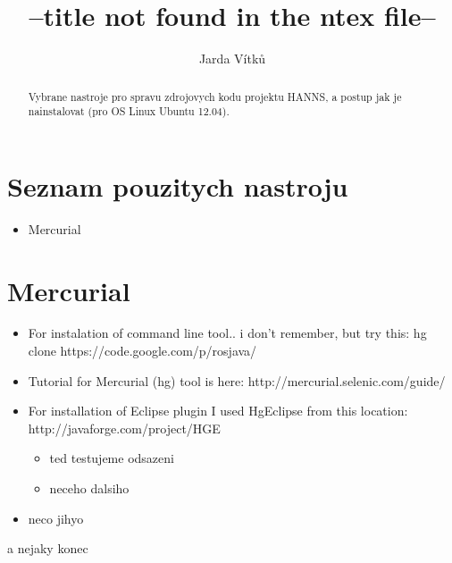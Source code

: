 \documentclass[journal,onecolumn]{IEEEtrancz}
\begin{document}
\title{--title not found in the ntex file--}
\author{Jarda Vítků}

\maketitle

\begin{abstract}
Vybrane nastroje pro spravu zdrojovych kodu projektu HANNS, a postup jak je nainstalovat (pro OS Linux Ubuntu 12.04).
\end{abstract}

\IEEEpeerreviewmaketitle



\section{Seznam pouzitych nastroju}


\begin{itemize}
	\item Mercurial


\end{itemize}
\section{Mercurial}


\begin{itemize}
	\item For instalation of command line tool.. i don't remember, but try this: hg clone https://code.google.com/p/rosjava/ 
	\item Tutorial for Mercurial (hg) tool is here: http://mercurial.selenic.com/guide/
		\vspace{3mm}
	\item For installation of Eclipse plugin I used HgEclipse from this location: http://javaforge.com/project/HGE
	\begin{itemize}
		\item ted testujeme odsazeni
		\item neceho dalsiho
	\end{itemize}

	\item neco jihyo
		\vspace{3mm}
\end{itemize}
a nejaky konec
\end{document}
